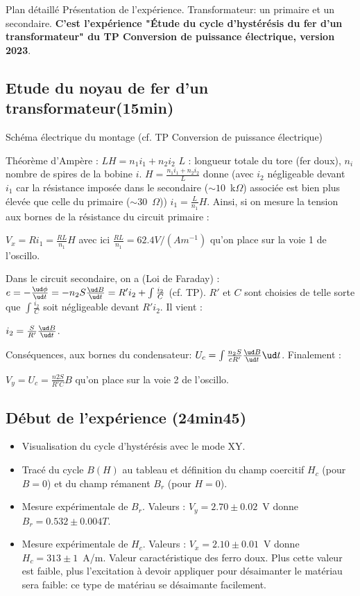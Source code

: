 \begin{reportBlock}{Plan détaillé}
Présentation de l'expérience. Transformateur: un primaire et un secondaire. \textbf{C'est l'expérience "Étude du cycle d'hystérésis du fer d'un transformateur" du TP Conversion de puissance électrique, version 2023}.

\subsection{Etude du noyau de fer d'un transformateur(15min)}

Schéma électrique du montage (cf. TP Conversion de puissance électrique)

Théorème d'Ampère : $L H = n_1 i_1 + n_2 i_2$
$L$ : longueur totale du tore (fer doux), $n_i$ nombre de spires de la bobine $i$. $H = \frac{n_1 i_1 + n_2 i_2}{L}$ donne (avec $i_2$ négligeable devant $i_1$ car la résistance imposée dans le secondaire ($\sim 10$~k$\Omega$) associée est bien plus élevée que celle du primaire ($\sim 30$~$\Omega$)) $i_1 = \frac{L}{n_1} H$. Ainsi, si on mesure la tension aux bornes de la résistance du circuit primaire : 

$V_x = R i_1 = \frac{R L}{n_1} H$ avec ici $\frac{R L}{n_1} = 62.4 V/(Am^{-1})$ qu'on place sur la voie 1 de l'oscillo.

Dans le circuit secondaire, on a (Loi de Faraday) : $e = -\frac{\ud \phi}{\ud t} = -n_2 S \frac{\ud B}{\ud t} = R' i_2 + \int \frac{i_2}{C}$ (cf. TP). $R'$ et $C$ sont choisies de telle sorte que $\int \frac{i_2}{C}$ soit négligeable devant $R' i_2$. Il vient :

$i_2 = \frac{S}{R'} \frac{\ud B}{\ud t}$.

Conséquences, aux bornes du condensateur: $U_c = \int \frac{n_2 S}{c R'} \frac{\ud B}{\ud t} \ud t$. Finalement :

$V_y = U_c = \frac{n2 S}{R' C} B$ qu'on place sur la voie 2 de l'oscillo.

\subsection*{Début de l'expérience (24min45)}

\begin{itemize}
    \item Visualisation du cycle d'hystérésis avec le mode XY.
    \item Tracé du cycle $B(H)$ au tableau et définition du champ coercitif $H_c$ (pour $B=0$) et du champ rémanent $B_r$ (pour $H=0$).
    \item Mesure expérimentale de $B_r$. Valeurs : $V_y = 2.70 \pm 0.02$~V donne $B_r = 0.532 \pm 0.004 T$. 
    \item Mesure expérimentale de $H_c$. Valeurs : $V_x = 2.10 \pm 0.01$~V donne $H_c = 313 \pm 1$~A/m. Valeur caractéristique des ferro doux. Plus cette valeur est faible, plus l'excitation à devoir appliquer pour désaimanter le matériau sera faible: ce type de matériau se désaimante facilement.  
\end{itemize}


\end{reportBlock}
